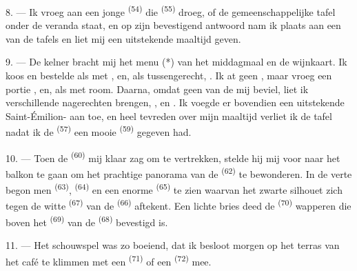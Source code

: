 8. --- Ik vroeg aan een jonge  \textsuperscript{(54)} die
 \textsuperscript{(55)} droeg, of de gemeenschappelijke tafel
onder de veranda staat, en op zijn bevestigend antwoord nam ik plaats aan een van de tafels en
liet mij een uitstekende maaltijd geven.


\VUsaut{4.0mm}
\VUsaut{3.0mm}

9. --- De kelner bracht mij het menu (*) van het middagmaal en de wijnkaart. Ik koos en
bestelde als  met , en, als tussengerecht,
. Ik at geen , maar vroeg een portie
, en, als  met room. Daarna, omdat geen van
de  mij beviel, liet ik verschillende nagerechten brengen,
,  en
. Ik voegde er bovendien een uitstekende
Saint-Émilion- aan toe, en heel tevreden over mijn maaltijd verliet ik de tafel
nadat ik de  \textsuperscript{(57)} een mooie
 \textsuperscript{(59)} gegeven had.

10. --- Toen de  \textsuperscript{(60)} mij klaar zag om te vertrekken,
stelde hij mij voor naar het balkon te gaan om het prachtige panorama van de 
\textsuperscript{(62)} te bewonderen. In de verte begon men 
\textsuperscript{(63)},  \textsuperscript{(64)} en een enorme
 \textsuperscript{(65)} te zien waarvan het zwarte silhouet zich tegen de
witte  \textsuperscript{(67)} van de  \textsuperscript{(66)}
aftekent. Een lichte bries deed de  \textsuperscript{(70)} wapperen die boven het
 \textsuperscript{(69)} van de  \textsuperscript{(68)}
bevestigd is.

\VUsaut{3.0mm}
\VUsaut{3.0mm}

11. --- Het schouwspel was zo boeiend, dat ik besloot morgen op het terras van het café te
klimmen met een  \textsuperscript{(71)} of een
 \textsuperscript{(72)} mee.


